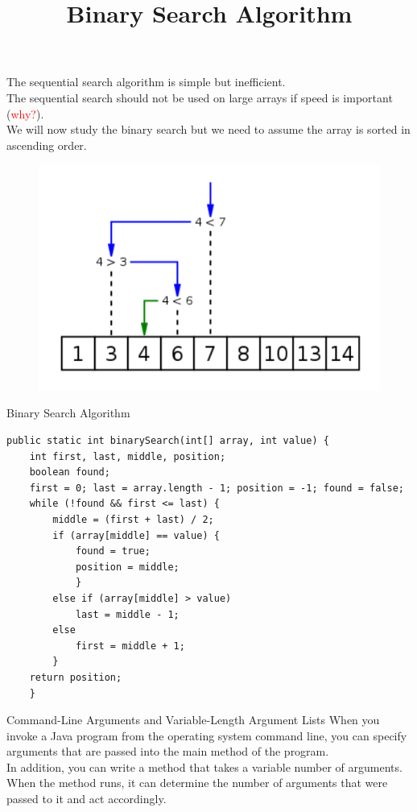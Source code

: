 \documentclass[11pt]{beamer}
\newcommand{\red}[1]{\textcolor{red}{#1}}
\begin{document}
\begin{frame}[fragile]
\title{Binary Search Algorithm}
    The sequential search algorithm is simple but inefficient. \\ \vspace{1em}
    The sequential search should not be used on large arrays if speed is important (\red{why?}). \\ \vspace{1em}
    We will now study the binary search but we need to assume the array is sorted in ascending order.
    \noindent 
    \begin{figure}[H]
    \centering
    \includegraphics[scale=0.6]{Images/chapter07_section11_BinarySearch01.png}
    \end{figure}
\end{frame}

\begin{frame}[fragile]
{Binary Search Algorithm}
    \begin{lstlisting}[basicstyle=\ttfamily\footnotesize]
public static int binarySearch(int[] array, int value) {
    int first, last, middle, position;
    boolean found;
    first = 0; last = array.length - 1; position = -1; found = false;
    while (!found && first <= last) {
        middle = (first + last) / 2;
        if (array[middle] == value) {
            found = true;
            position = middle;
            }
        else if (array[middle] > value)
            last = middle - 1;
        else
            first = middle + 1;
        }
    return position;
    }
    \end{lstlisting}
\end{frame}


\begin{frame}[fragile]
{Command-Line Arguments and Variable-Length Argument Lists}
    When you invoke a Java program from the operating system command line, you can specify arguments that are passed into the main method of the program. \\ \vspace{1em} 
    In addition, you can write a method that takes a variable number of arguments. \\ \vspace{1em} 
    When the method runs, it can determine the number of arguments that were passed to it and act accordingly.
\end{frame}
\end{document}
